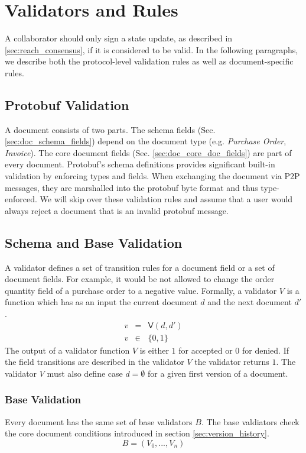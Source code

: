 \section{Validators and Rules}
A collaborator should only sign a state update, as described in \ref{sec:reach_consensus}, if it is considered to be valid. In the following paragraphs, we describe both the protocol-level validation rules as well as document-specific rules.

\subsection{Protobuf Validation}
A document consists of two parts. The schema fields (Sec. \ref{sec:doc_schema_fields}) depend on the document type (e.g. \textit{Purchase Order}, \textit{Invoice}). The core document fields (Sec. \ref{sec:doc_core_doc_fields}) are part of every document. Protobuf's schema definitions provides significant built-in validation by enforcing types and fields. When exchanging the document via P2P messages, they are marshalled into the protobuf byte format and thus type-enforced. We will skip over these validation rules and assume that a user would always reject a document that is an invalid protobuf message.

\subsection{Schema and Base Validation}
A validator defines a set of transition rules for a document field or a set of document fields. For example, it would be not allowed to change the order quantity field of a purchase order to a negative value. Formally, a validator $V$ is a function which has as an input the current document $d$ and the next document $d'$.
\begin{eqnarray}
v & = & \mathsf{V}(d, d') \\
 v &\in & \{0,1\}
\end{eqnarray}
The output of a validator function $V$ is either $1$ for accepted or $0$ for denied. If the field transitions are described in the validator $V$ the validator returns $1$.
The validator $V$ must also define case $d = \emptyset$ for a given first version of a document. 
\subsubsection{Base Validation}
Every document has the same set of base validators $B$. The base valdiators check the core document conditions introduced in section \ref{sec:version_history}. 
\begin{equation}
     B = (V_0,...,V_n) 
\end{equation}
